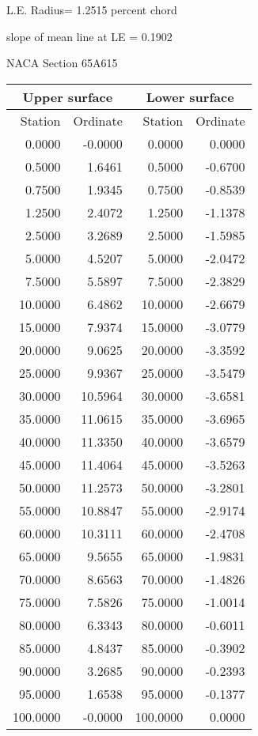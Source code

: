 \documentclass[11pt]{book}
\begin{document}
L.E. Radius=  1.2515 percent chord


 slope of mean line at LE =  0.1902
 \newpage
  \label{s65A615}
 \begin{Large}
 NACA Section 65A615
 \end{Large}
  
 \vspace{8mm}
 \begin{tabular}{|r|r|r|r|} \hline 
 \multicolumn{2}{|c|}{Upper surface} & \multicolumn{2}{|c|}{Lower surface} \\
 \hline
 Station & Ordinate & Station & Ordinate \\
 \hline
0.0000 & -0.0000 & 0.0000 & 0.0000 \\
0.5000 & 1.6461 & 0.5000 & -0.6700 \\
0.7500 & 1.9345 & 0.7500 & -0.8539 \\
1.2500 & 2.4072 & 1.2500 & -1.1378 \\
2.5000 & 3.2689 & 2.5000 & -1.5985 \\
5.0000 & 4.5207 & 5.0000 & -2.0472 \\
7.5000 & 5.5897 & 7.5000 & -2.3829 \\
10.0000 & 6.4862 & 10.0000 & -2.6679 \\
15.0000 & 7.9374 & 15.0000 & -3.0779 \\
20.0000 & 9.0625 & 20.0000 & -3.3592 \\
25.0000 & 9.9367 & 25.0000 & -3.5479 \\
30.0000 & 10.5964 & 30.0000 & -3.6581 \\
35.0000 & 11.0615 & 35.0000 & -3.6965 \\
40.0000 & 11.3350 & 40.0000 & -3.6579 \\
45.0000 & 11.4064 & 45.0000 & -3.5263 \\
50.0000 & 11.2573 & 50.0000 & -3.2801 \\
55.0000 & 10.8847 & 55.0000 & -2.9174 \\
60.0000 & 10.3111 & 60.0000 & -2.4708 \\
65.0000 & 9.5655 & 65.0000 & -1.9831 \\
70.0000 & 8.6563 & 70.0000 & -1.4826 \\
75.0000 & 7.5826 & 75.0000 & -1.0014 \\
80.0000 & 6.3343 & 80.0000 & -0.6011 \\
85.0000 & 4.8437 & 85.0000 & -0.3902 \\
90.0000 & 3.2685 & 90.0000 & -0.2393 \\
95.0000 & 1.6538 & 95.0000 & -0.1377 \\
100.0000 & -0.0000 & 100.0000 & 0.0000 \\
 \hline 
 \end{tabular}
\end{document}
